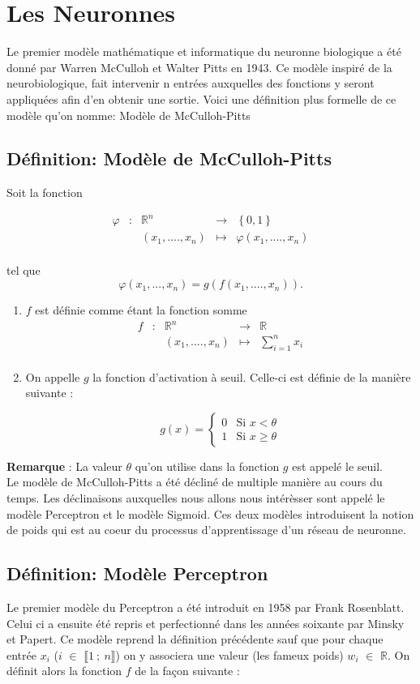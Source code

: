 \documentclass{article}
\newcommand{\fonction}[5]{
	\begin{array}{ccccc}
#1 & : & #2 & \to & #3\\
	& & #4 & \mapsto & #5\\ 
	\end{array}
}
\begin{document}
\section[Titre plus court]{Les Neuronnes}

Le premier modèle mathématique et informatique du neuronne biologique a été donné par Warren McCulloh et Walter Pitts en 1943.
Ce modèle inspiré de la neurobiologique, fait intervenir n entrées auxquelles des fonctions y seront appliquées afin d'en obtenir une sortie.
Voici une définition plus formelle de ce modèle qu'on nomme: Modèle de McCulloh-Pitts     

\subsection{Définition: Modèle de McCulloh-Pitts}
	Soit la fonction  

	\[\fonction{\varphi}{\mathbb{R}^n}{\left\{0,1\right\}}{(x_1,....,x_n)}{\varphi(x_1,....,x_n)} \]

	tel que  
	\[\varphi (x_1,...,x_n) = g(f(x_1,....,x_n)). \]  

	\begin{enumerate}
		\item $f$ est définie comme étant la fonction somme 
		\[\fonction{f}{\mathbb{R}^n}{\mathbb{R}}{(x_1,....,x_n)}{\sum_{i=1}^{n} {x_i}} \] 
		\item On appelle $g$ la fonction d'activation à seuil. Celle-ci est définie de la manière suivante :

		\[g(x) = \begin{cases} 0 &\mbox{Si } x < \theta \\
				 1 & \mbox{Si } x \geq \theta
	 		 \end{cases} 
		\]
	\end{enumerate}
	
	\textbf{Remarque} : La valeur $\theta$  qu'on utilise dans la fonction $g$ est appelé le seuil.\\
	

Le modèle de McCulloh-Pitts a été décliné de multiple manière au cours du temps. Les déclinaisons auxquelles nous allons nous intérèsser sont appelé le modèle Perceptron et le modèle Sigmoid. Ces deux modèles introduisent la notion de poids qui est au coeur du processus d'apprentissage d'un réseau de neuronne. 

	\subsection{Définition: Modèle Perceptron}
		Le premier modèle du Perceptron a été introduit en 1958 par Frank Rosenblatt. Celui ci a ensuite été repris et perfectionné dans les années soixante par Minsky et Papert. Ce modèle reprend la définition précédente sauf que pour chaque entrée $x_i$ ($i$ $\in$ $\llbracket 1~;~n \rrbracket$) on y associera une valeur (les fameux poids) $w_i$ $\in$ $\mathbb{R}$. 
		On définit alors la fonction $f$ de la façon suivante : 
		
\end{document}
